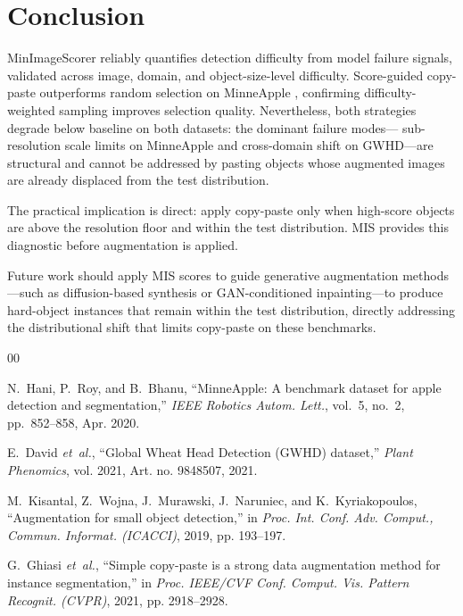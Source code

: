\documentclass[conference]{IEEEtran}
\begin{document}
\section{Conclusion}

MinImageScorer reliably quantifies detection difficulty from model
failure signals, validated across image, domain, and
object-size-level difficulty.
Score-guided copy-paste outperforms random selection on
MinneApple , confirming difficulty-weighted sampling
improves selection quality. Nevertheless, both strategies degrade
below baseline on both datasets: the dominant failure modes---
sub-resolution scale limits on MinneApple and cross-domain shift
on GWHD---are structural and cannot be addressed by pasting
objects whose augmented images are already displaced from the
test distribution.

The practical implication is direct: apply copy-paste only when
high-score objects are above the resolution floor and within the
test distribution. MIS provides this diagnostic before augmentation
is applied.

Future work should apply MIS scores to guide generative
augmentation methods---such as diffusion-based synthesis or
GAN-conditioned inpainting---to produce hard-object instances
that remain within the test distribution, directly addressing the
distributional shift that limits copy-paste on these benchmarks.

\begin{thebibliography}{00}

N.~Hani, P.~Roy, and B.~Bhanu,
``MinneApple: A benchmark dataset for apple detection and
segmentation,''
\textit{IEEE Robotics Autom. Lett.},
vol.~5, no.~2, pp.~852--858, Apr. 2020.

E.~David \textit{et~al.},
``Global Wheat Head Detection (GWHD) dataset,''
\textit{Plant Phenomics}, vol. 2021, Art. no. 9848507, 2021.

M.~Kisantal, Z.~Wojna, J.~Murawski, J.~Naruniec, and K.~Kyriakopoulos,
``Augmentation for small object detection,''
in \textit{Proc. Int. Conf. Adv. Comput., Commun. Informat. (ICACCI)}, 2019, pp. 193--197.

G.~Ghiasi \textit{et~al.},
``Simple copy-paste is a strong data augmentation method for instance segmentation,''
in \textit{Proc. IEEE/CVF Conf. Comput. Vis. Pattern Recognit. (CVPR)}, 2021, pp. 2918--2928.

\end{thebibliography}
\end{document}
